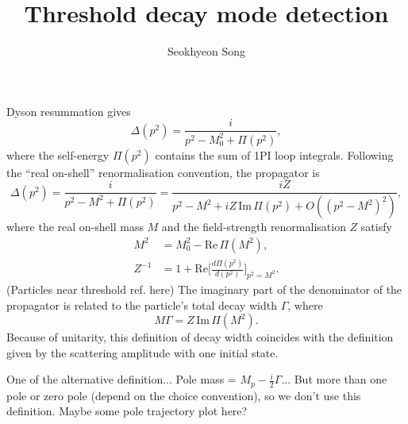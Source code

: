 \documentclass[11pt]{article}
\theoremstyle{definition}
\theoremstyle{remark}
\begin{document}
	\title{Threshold decay mode detection}
	\author{Seokhyeon Song}
	\maketitle
	
	\section{}
	Dyson resummation gives
	\[\Delta(p^{2})=\frac{i}{p^{2}-M_{0}^{2}+\Pi(p^{2})},\]
	where the self-energy $\Pi(p^{2})$ contains the sum of 1PI loop integrals.
	Following the ``real on-shell'' renormalisation convention, the propagator is
	\[\Delta(p^{2})=\frac{i}{p^{2}-M^{2}+\Pi(p^{2})}=\frac{iZ}{p^{2}-M^{2}+iZ\,\mathrm{Im}\,\Pi(p^{2})+O((p^{2}-M^{2})^{2})},\]
	where the real on-shell mass $M$ and the field-strength renormalisation $Z$ satisfy
	\begin{align*}
		M^{2}&=M_{0}^{2}-\mathrm{Re}\,\Pi(M^{2}),\\
		Z^{-1}&=1+\mathrm{Re}\bigg[\frac{d\Pi(p^{2})}{d(p^{2})}\bigg]_{p^{2}=M^{2}}.
	\end{align*}
	(Particles near threshold ref. here)
	The imaginary part of the denominator of the propagator is related to the particle's total decay width $\Gamma$, where
	\[M\Gamma=Z\,\mathrm{Im}\,\Pi(M^{2}).\]
	Because of unitarity, this definition of decay width coincides with the definition given by the scattering amplitude with one initial state.
	
	One of the alternative definition...
	Pole mass = $M_{p}-\frac{i}{2}\Gamma$...
	But more than one pole or zero pole (depend on the choice convention), so we don't use this definition.
	Maybe some pole trajectory plot here?
\end{document}
